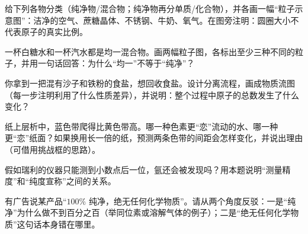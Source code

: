 \begin{sikaoti}
\item 给下列各物分类（纯净物/混合物；纯净物再分单质/化合物），并各画一幅“粒子示意图”：洁净的空气、蔗糖晶体、不锈钢、牛奶、氧气。在图旁注明：圆圈大小不代表原子的真实比例。
\item 一杯白糖水和一杯汽水都是均一混合物。画两幅粒子图，各标出至少三种不同的粒子，并用一句话回答：为什么“均一”不等于“纯净”？
\item 你拿到一把混有沙子和铁粉的食盐，想回收食盐。设计分离流程，画成物质流图（每一步注明利用了什么性质差异），并说明：整个过程中原子的总数发生了什么变化？
\item 纸上层析中，蓝色带爬得比黄色带高。哪一种色素更“恋”流动的水、哪一种更“恋”纸面？如果换用长一倍的纸，预测两条色带的间距会怎样变化，并说出理由（可借用挑战框的思路）。
\item 假如瑞利的仪器只能测到小数点后一位，氩还会被发现吗？用本题说明“测量精度”和“纯度宣称”之间的关系。
\item 有广告说某产品“$100\%$ 纯净，绝无任何化学物质”。请从两个角度反驳：一是“纯净”为什么做不到百分之百（举同位素或溶解气体的例子）；二是“绝无任何化学物质”这句话本身错在哪里。
\end{sikaoti}
